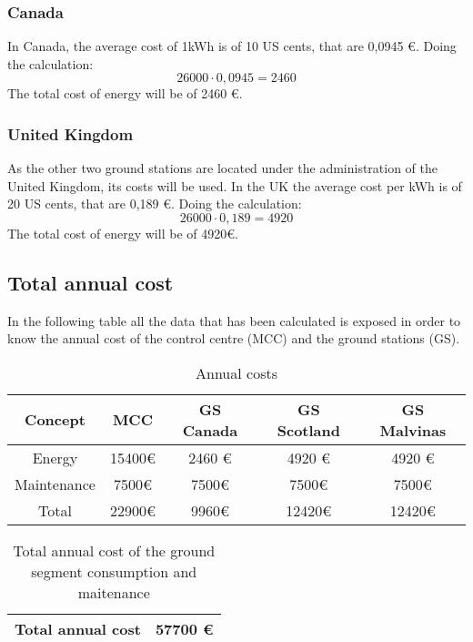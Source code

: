 \documentclass[12pt,a4paper]{report}
\begin{document}
\subsubsection{Canada}
In Canada, the average cost of 1kWh is of 10 US cents, that are 0,0945 \euro. Doing the calculation:
\begin{equation}
26000\cdot 0,0945= 2460
\end{equation}
The total cost of energy will be of 2460 \euro.
\subsubsection{United Kingdom}
As the other two ground stations are located under the administration of the United Kingdom, its costs will be used. In the UK the average cost per kWh is of 20 US cents, that are 0,189 \euro. Doing the calculation: 
  \begin{equation}
26000\cdot 0,189= 4920
\end{equation}
The total cost of energy will be of 4920\euro. 
\subsection{Total annual cost}
In the following table all the data that has been calculated is exposed in order to know the annual cost of the control centre (MCC) and the ground stations (GS).
\begin{table}[H]
\begin{center}
\begin{tabular}{|c|c|c|c|c|}
\hline
\textbf{Concept}&\textbf{MCC}&\textbf{GS Canada}&\textbf{GS Scotland}&\textbf{GS Malvinas}\\
\hline
Energy&15400\euro &2460 \euro &4920 \euro &4920 \euro\\
\hline
Maintenance&7500\euro &7500\euro &7500\euro &7500\euro \\
\hline
Total&22900\euro &9960\euro &12420\euro &12420\euro \\
\hline
\end{tabular}
\caption{Annual costs}
\end{center}
\end{table}
\begin{table}[H]
\begin{center}
\begin{tabular}{|c|c|}
\hline
\textbf{Total annual cost}&\textbf{57700 \euro}\\
\hline
\end{tabular}
\caption{Total annual cost of the ground segment consumption and maitenance}
\end{center}
\end{table}


\end{document}
